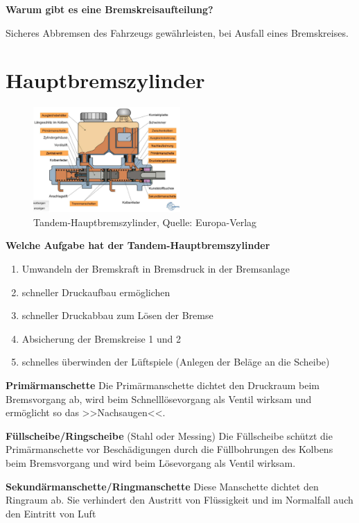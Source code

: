 \textbf{Warum gibt es eine Bremskreisaufteilung?}

Sicheres Abbremsen des Fahrzeugs gewährleisten, bei Ausfall eines
Bremskreises.

\newpage

\section{Hauptbremszylinder}\label{hauptbremszylinder}

\begin{figure}[!ht]%
\centering
\includegraphics[width=0.5\textwidth]{images/Bremsen/Bremsen-3.pdf}
\caption{Tandem-Hauptbremszylinder, Quelle: Europa-Verlag}
\end{figure}

\textbf{Welche Aufgabe hat der Tandem-Hauptbremszylinder}

\begin{enumerate}
\item
  Umwandeln der Bremskraft in Bremsdruck in der Bremsanlage
\item
  schneller Druckaufbau ermöglichen
\item
  schneller Druckabbau zum Lösen der Bremse
\item
  Absicherung der Bremskreise 1 und 2
\item
  schnelles überwinden der Lüftspiele (Anlegen der Beläge an die
  Scheibe)
\end{enumerate}

\textbf{Primärmanschette} Die Primärmanschette dichtet den Druckraum
beim Bremsvorgang ab, wird beim Schnelllösevorgang als Ventil wirksam
und ermöglicht so das >>Nachsaugen<<.

\textbf{Füllscheibe/Ringscheibe} (Stahl oder Messing) Die Füllscheibe
schützt die Primärmanschette vor Beschädigungen durch die Füllbohrungen
des Kolbens beim Bremsvorgang und wird beim Lösevorgang als Ventil
wirksam.

\textbf{Sekundärmanschette/Ringmanschette} Diese Manschette dichtet den
Ringraum ab. Sie verhindert den Austritt von Flüssigkeit und im
Normalfall auch den Eintritt von Luft

